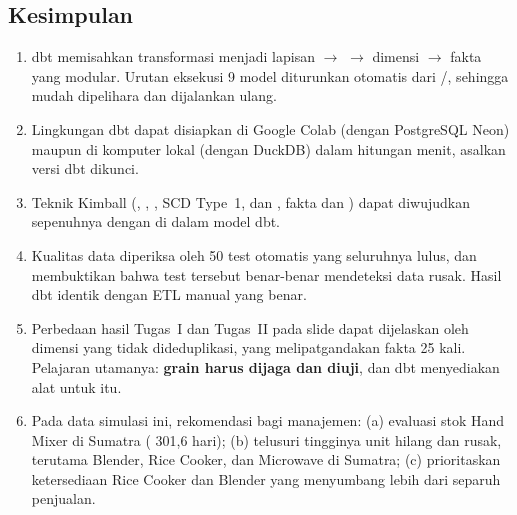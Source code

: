 \subsection{Kesimpulan}
\begin{enumerate}
    \item dbt memisahkan transformasi menjadi lapisan  $\rightarrow$  $\rightarrow$ dimensi $\rightarrow$ fakta yang modular. Urutan eksekusi 9 model diturunkan otomatis dari /, sehingga  mudah dipelihara dan dijalankan ulang.
    \item Lingkungan dbt dapat disiapkan di Google Colab (dengan PostgreSQL Neon) maupun di komputer lokal (dengan DuckDB) dalam hitungan menit, asalkan versi dbt dikunci.
    \item Teknik Kimball (, , , SCD Type~1,  dan , fakta  dan ) dapat diwujudkan sepenuhnya dengan  di dalam model dbt.
    \item Kualitas data diperiksa oleh 50 test otomatis yang seluruhnya lulus, dan  membuktikan bahwa test tersebut benar-benar mendeteksi data rusak. Hasil dbt identik dengan ETL manual yang benar.
    \item Perbedaan hasil Tugas~I dan Tugas~II pada slide dapat dijelaskan oleh dimensi yang tidak dideduplikasi, yang melipatgandakan fakta 25 kali. Pelajaran utamanya: \textbf{grain harus dijaga dan diuji}, dan dbt menyediakan alat untuk itu.
    \item Pada data simulasi ini, rekomendasi bagi manajemen: (a) evaluasi stok Hand Mixer di Sumatra ( 301,6 hari); (b) telusuri tingginya unit hilang dan rusak, terutama Blender, Rice Cooker, dan Microwave di Sumatra; (c) prioritaskan ketersediaan Rice Cooker dan Blender yang menyumbang lebih dari separuh penjualan.
\end{enumerate}

